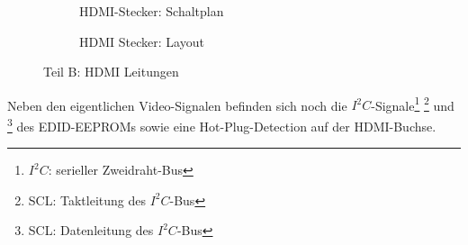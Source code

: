 \begin{figure}[htbp]
        \centering
        \begin{subfigure}[htp]{0.48\textwidth}
%			
			\fbox{	\texttt{[image: TeilB/hdmi\_sch.png]}}
            \caption{HDMI-Stecker: Schaltplan}
            \label{fig:teilb_hdmi_sch}
        \end{subfigure}
\quad 
        \begin{subfigure}[htp]{0.48\textwidth}
 			\caption{HDMI Stecker: Layout}
            \label{fig:teilb_hdmi_pcb}
        \end{subfigure}
        \caption{Teil B: HDMI Leitungen}
        \label{fig:teilb_hdmi}
\end{figure}
Neben den eigentlichen Video-Signalen befinden sich noch die $I^2C$-Signale\footnote{$I^2C$: serieller Zweidraht-Bus} \footnote{SCL: Taktleitung des $I^2C$-Bus} und \footnote{SCL: Datenleitung des $I^2C$-Bus} des EDID-EEPROMs sowie eine Hot-Plug-Detection auf der HDMI-Buchse.
